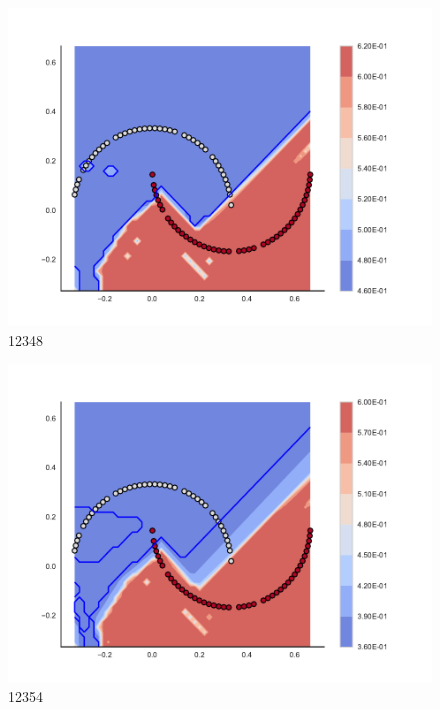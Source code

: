 \begin{subfigure}[b]{0.09\textwidth}
    \includegraphics[clip, trim=2.35cm 1.75cm 4.5cm 0cm,width=\textwidth]{img/convergence/12348.pdf}
    \caption{12348}
    \label{fig:convergence_12348}
\end{subfigure}
%
\begin{subfigure}[b]{0.09\textwidth}
    \includegraphics[clip, trim=2.35cm 1.75cm 4.5cm 0cm,width=\textwidth]{img/convergence/12354.pdf}
    \caption{12354}
    \label{fig:convergence_12354}
\end{subfigure}
%
